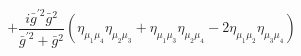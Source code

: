 %
\begin{dmath*}
%
  +  \frac{i {\bar g}^{\prime 2} {\bar g}{}^2}{{\bar g}^{\prime 2} + {\bar g}{}^2} \left(\eta_{\mu_1 \mu_4} \eta_{\mu_2 \mu_3} + \eta_{\mu_1 \mu_3} \eta_{\mu_2 \mu_4} - 2 \eta_{\mu_1 \mu_2} \eta_{\mu_3 \mu_4}\right)
%
\end{dmath*}
%
